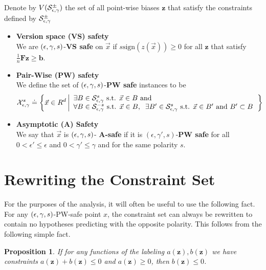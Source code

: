 \documentclass{article}
\newtheorem{prop}[thm]{Proposition}
\newcommand{\X}{{\cal X}}
\newcommand{\x}{\vec{x}}
\newcommand{\vF}{\mathbf{F}}
\newcommand{\vb}{\mathbf{b}}
\newcommand{\vz}{\mathbf{z}}
\newcommand{\sign}{\text{sign}}
\newcommand{\comment}[3]{\marginpar{\textcolor{#2}{#1: #3}}}
\newcommand{\akshay}[1]{\comment{Akshay}{magenta}{#1}}
\begin{document}
Denote by $V({\cal S}_{\epsilon,\gamma}^{\pm})$ the set of all point-wise biases $\vz$
that satisfy the constraints defined by ${\cal S}_{\epsilon,\gamma}^{\pm}$

\begin{itemize}
\item {\bf Version space (VS) safety}\\
We are $(\epsilon,\gamma,s)$-{\bf VS safe} on $\x$ if $s\sign(z(\x)) \geq 0$
for all $\vz$ that satisfy  $ \frac{1}{n} \vF \vz \geq \vb$.

\newcommand{\XepsGamSig}{\X_{\epsilon,\edge}^{s}}
\newcommand{\XepsGam}{\X_{\epsilon,\edge}}

\item
{\bf Pair-Wise (PW) safety}\\
We define the set of $(\epsilon,\gamma,s)$-{\bf PW safe} instances
to be 
\[
\XepsGamSig \doteq \left\{\x \in R^d \left|
\begin{array}{l}
\exists B \in \SepsGamSig \mbox{ s.t. } \x \in B \mbox{ and } \\
\forall B \in \SepsGamMinusSig \mbox{ s.t. } \x \in B,\;\;
\exists B' \in \SepsGamSig \mbox{ s.t. } \x \in B' \mbox{ and } B'
\subset B
\end{array}
\right. \right\}
\]

\item
{\bf Asymptotic (A) Safety}\\ We say that $\x$ is $(\epsilon,\gamma,s)$- {\bf A-safe} if
it is $(\epsilon,\gamma',s)$-{\bf PW safe} for all $0<\epsilon' \leq
\epsilon$ and $0<\gamma' \leq \gamma$ and for the same polarity $s$.
\end{itemize}






\section{Rewriting the Constraint Set}

For the purposes of the analysis, it will often be useful to use the following fact. 
For any $(\epsilon,\gamma,s)$-PW-safe point $ x $,
the constraint set can always be rewritten to contain no hypotheses predicting with the opposite polarity. 
This follows from the following simple fact.
\akshay{Please rewrite this if the notation is still not satisfactory. I went to the opposite extreme as last time, making it as general as possible.}

\begin{prop}
If for any functions of the labeling $a (\vz), b (\vz)$ we have constraints $a (\vz) + b (\vz) \leq 0$ and $a (\vz) \geq 0$, 
then $b (\vz) \leq 0$.
\end{prop}
\end{document}

